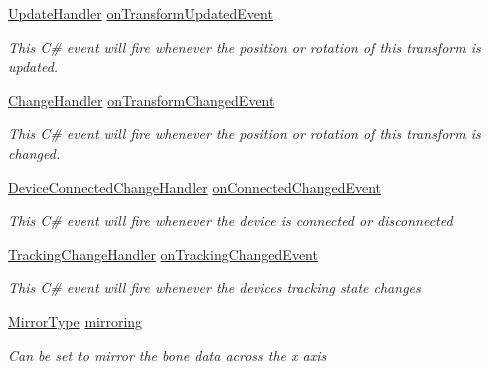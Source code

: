 \begin{DoxyCompactItemize}
\mbox{\hyperlink{class_valve_1_1_v_r_1_1_steam_v_r___behaviour___skeleton_aca86be067e5094667bce3ba86677dd0b}{Update\+Handler}} \mbox{\hyperlink{class_valve_1_1_v_r_1_1_steam_v_r___behaviour___skeleton_aa9dad2b5001f6b3cf5c5adf0307cffa2}{on\+Transform\+Updated\+Event}}
\begin{DoxyCompactList}\small\item\em This C\# event will fire whenever the position or rotation of this transform is updated. \end{DoxyCompactList}\item 
\mbox{\hyperlink{class_valve_1_1_v_r_1_1_steam_v_r___behaviour___skeleton_ab2e28cae75fa463e2dcbeccd01607c48}{Change\+Handler}} \mbox{\hyperlink{class_valve_1_1_v_r_1_1_steam_v_r___behaviour___skeleton_a2fc1a43e773dc875c4d0364ab313eb7b}{on\+Transform\+Changed\+Event}}
\begin{DoxyCompactList}\small\item\em This C\# event will fire whenever the position or rotation of this transform is changed. \end{DoxyCompactList}\item 
\mbox{\hyperlink{class_valve_1_1_v_r_1_1_steam_v_r___behaviour___skeleton_aa05646483bd740b42ea2455f964f9cf7}{Device\+Connected\+Change\+Handler}} \mbox{\hyperlink{class_valve_1_1_v_r_1_1_steam_v_r___behaviour___skeleton_a3ea97595c81c84bc29a6b4865b3aba23}{on\+Connected\+Changed\+Event}}
\begin{DoxyCompactList}\small\item\em This C\# event will fire whenever the device is connected or disconnected \end{DoxyCompactList}\item 
\mbox{\hyperlink{class_valve_1_1_v_r_1_1_steam_v_r___behaviour___skeleton_a473b611af60d6c89ba50e62833c23cd8}{Tracking\+Change\+Handler}} \mbox{\hyperlink{class_valve_1_1_v_r_1_1_steam_v_r___behaviour___skeleton_a1a307b208ac7ada02ea92e0734160290}{on\+Tracking\+Changed\+Event}}
\begin{DoxyCompactList}\small\item\em This C\# event will fire whenever the device\textquotesingle{}s tracking state changes \end{DoxyCompactList}\item 
\mbox{\hyperlink{class_valve_1_1_v_r_1_1_steam_v_r___behaviour___skeleton_a3188d8ae0638290912932d7ae16b4a02}{Mirror\+Type}} \mbox{\hyperlink{class_valve_1_1_v_r_1_1_steam_v_r___behaviour___skeleton_a1d28330bba50a010abd1deac97920b12}{mirroring}}
\begin{DoxyCompactList}\small\item\em Can be set to mirror the bone data across the x axis \end{DoxyCompactList}\end{DoxyCompactItemize}
